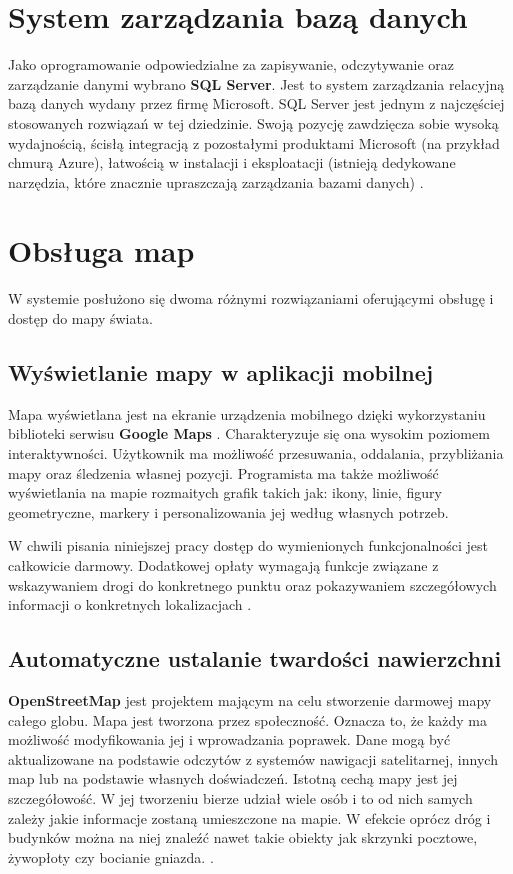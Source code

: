 \section{System zarządzania bazą danych}
Jako oprogramowanie odpowiedzialne za zapisywanie, odczytywanie oraz zarządzanie danymi wybrano \textbf{SQL Server}. Jest to system zarządzania relacyjną bazą danych wydany przez firmę Microsoft. SQL Server jest jednym z najczęściej stosowanych rozwiązań w tej dziedzinie. Swoją pozycję zawdzięcza sobie wysoką wydajnością, ścisłą integracją z pozostałymi produktami Microsoft (na przykład chmurą Azure), łatwością w instalacji i eksploatacji (istnieją dedykowane narzędzia, które znacznie upraszczają zarządzania bazami danych)  \cite{ksiazka-sql}.

\section{Obsługa map}
W systemie posłużono się dwoma różnymi rozwiązaniami oferującymi obsługę i dostęp do mapy świata.
\subsection{Wyświetlanie mapy w aplikacji mobilnej}
Mapa wyświetlana jest na ekranie urządzenia mobilnego dzięki wykorzystaniu biblioteki serwisu \textbf{Google Maps} \cite{google-maps}. Charakteryzuje się ona wysokim poziomem interaktywności. Użytkownik ma możliwość przesuwania, oddalania, przybliżania mapy oraz śledzenia własnej pozycji. Programista ma także możliwość wyświetlania na mapie rozmaitych grafik takich jak: ikony, linie, figury geometryczne, markery i personalizowania jej według własnych potrzeb.

W chwili pisania niniejszej pracy dostęp do wymienionych funkcjonalności jest całkowicie darmowy. Dodatkowej opłaty wymagają funkcje związane z wskazywaniem drogi do konkretnego punktu oraz pokazywaniem szczegółowych informacji o konkretnych lokalizacjach \cite{google-maps-pricing}.
\subsection{Automatyczne ustalanie twardości nawierzchni}
\textbf{OpenStreetMap} \cite{osm} jest projektem mającym na celu stworzenie darmowej mapy całego globu. Mapa jest tworzona przez społeczność. Oznacza to, że każdy ma możliwość modyfikowania jej i wprowadzania poprawek. Dane mogą być aktualizowane na podstawie odczytów z systemów nawigacji satelitarnej, innych map lub na podstawie własnych doświadczeń. Istotną cechą mapy jest jej szczegółowość. W jej tworzeniu bierze udział wiele osób i to od nich samych zależy jakie informacje zostaną umieszczone na mapie. W efekcie oprócz dróg i budynków można na niej znaleźć nawet takie obiekty jak skrzynki pocztowe, żywopłoty czy bocianie gniazda. \cite{osm-gather-data}. 

